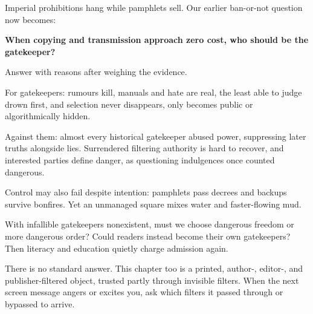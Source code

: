 Imperial prohibitions hang while pamphlets sell. Our earlier ban-or-not question now becomes:

\textbf{When copying and transmission approach zero cost, who should be the gatekeeper?}

Answer with reasons after weighing the evidence.

For gatekeepers: rumours kill, manuals and hate are real, the least able to judge drown first, and selection never disappears, only becomes public or algorithmically hidden.

Against them: almost every historical gatekeeper abused power, suppressing later truths alongside lies. Surrendered filtering authority is hard to recover, and interested parties define danger, as questioning indulgences once counted dangerous.

Control may also fail despite intention: pamphlets pass decrees and backups survive bonfires. Yet an unmanaged square mixes water and faster-flowing mud.

With infallible gatekeepers nonexistent, must we choose dangerous freedom or more dangerous order? Could readers instead become their own gatekeepers? Then literacy and education quietly charge admission again.

There is no standard answer. This chapter too is a printed, author-, editor-, and publisher-filtered object, trusted partly through invisible filters. When the next screen message angers or excites you, ask which filters it passed through or bypassed to arrive.
